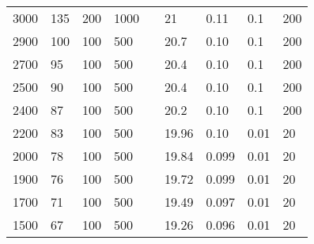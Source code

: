 \documentclass{article}
\begin{document}
\begin{table}[H]
\begin{tabular}{|l|l|l|l|l|l|l|l|l|}
        3000          & 135                       & 200                       & 1000                       &  & 21         & 0.11                       & 0.1                        & 200                        \\ \cline{1-4} \cline{6-9}
        2900          & 100                       & 100                       & 500                        &  & 20.7       & 0.10                       & 0.1                        & 200                        \\ \cline{1-4} \cline{6-9}
        2700          & 95                        & 100                       & 500                        &  & 20.4       & 0.10                       & 0.1                        & 200                        \\ \cline{1-4} \cline{6-9}
        2500          & 90                        & 100                       & 500                        &  & 20.4       & 0.10                       & 0.1                        & 200                        \\ \cline{1-4} \cline{6-9}
        2400          & 87                        & 100                       & 500                        &  & 20.2       & 0.10                       & 0.1                        & 200                        \\ \cline{1-4} \cline{6-9}
        2200          & 83                        & 100                       & 500                        &  & 19.96      & 0.10                       & 0.01                       & 20                         \\ \cline{1-4} \cline{6-9}
        2000          & 78                        & 100                       & 500                        &  & 19.84      & 0.099                      & 0.01                       & 20                         \\ \cline{1-4} \cline{6-9}
        1900          & 76                        & 100                       & 500                        &  & 19.72      & 0.099                      & 0.01                       & 20                         \\ \cline{1-4} \cline{6-9}
        1700          & 71                        & 100                       & 500                        &  & 19.49      & 0.097                      & 0.01                       & 20                         \\ \cline{1-4} \cline{6-9}
        1500          & 67                        & 100                       & 500                        &  & 19.26      & 0.096                      & 0.01                       & 20                         \\ \cline{1-4} \cline{6-9}

\end{tabular}
\end{table}
\end{document}
